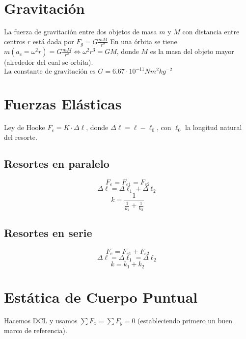 \documentclass[a4paper]{article}
\begin{document}
\section{Gravitación}
La fuerza de gravitación entre dos objetos de masa $m$ y $M$ con
distancia entre centros $r$ está dada por \(
F_g = G\frac{mM}{r^2}
\)
En una órbita se tiene $m(a_c = \omega^2r) = G\frac{mM}{r^2} \iff
\omega^2r^3 = GM$, donde $M$ es la masa del objeto mayor (alrededor del cual
se orbita).
\(\text{La constante de gravitación es } G = 6.67 \cdot 10^{-11}
Nm^2kg^{-2}\)

\section{Fuerzas Elásticas}
Ley de Hooke $F_e = K\cdot \Delta\ell$, donde $\Delta\ell = \ell - \ell_0$,
con $\ell_0$ la longitud natural del resorte.
\begin{multicols}{2}

	\subsection{Resortes en paralelo}

\[
F_e = F_{e1} = F_{e2}
\]
\[
\Delta\ell = \Delta\ell_1 + \Delta\ell_2
\]
\[
	k = \frac{1}{\frac{1}{k_1} +\frac{1}{k_2}}
\]

	\columnbreak

	\subsection{Resortes en serie}

\[
F_e = F_{e1} + F_{e2}
\]
\[
\Delta\ell = \Delta\ell_1 = \Delta\ell_2
\]
\[
	k = k_1 + k_2
\]
\end{multicols}
\section{Estática de Cuerpo Puntual}
Hacemos DCL y usamos $\sum F_x = \sum F_y = 0$ (estableciendo primero un
buen marco de referencia).
\end{document}
